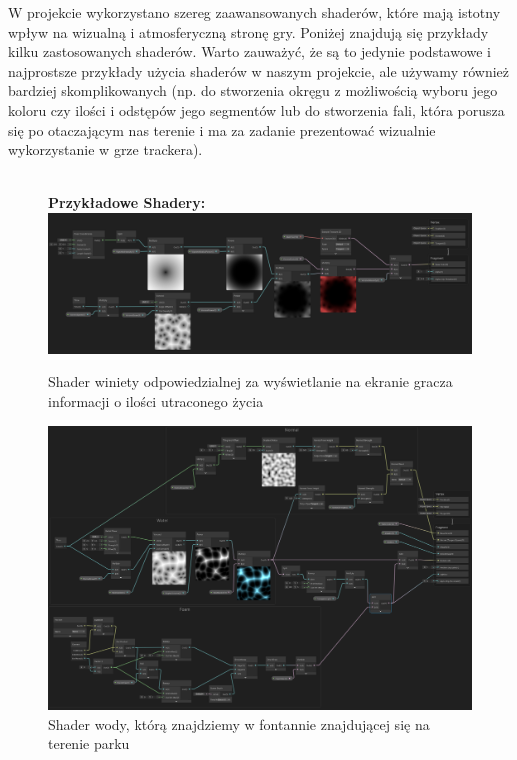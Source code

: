 W projekcie wykorzystano szereg zaawansowanych shaderów, które mają istotny wpływ na wizualną i atmosferyczną stronę gry. Poniżej znajdują się przykłady kilku zastosowanych shaderów. Warto zauważyć, że są to jedynie podstawowe i najprostsze przykłady użycia shaderów w naszym projekcie, ale używamy również bardziej skomplikowanych (np. do stworzenia okręgu z możliwością wyboru jego koloru czy ilości i odstępów jego segmentów lub do stworzenia fali, która porusza się po otaczającym nas terenie i ma za zadanie prezentować wizualnie wykorzystanie w grze trackera). \\ \\
\begin{figure}[h]
\textbf{Przykładowe Shadery:}
    \centering
    \includegraphics[width=1\linewidth]{Images/vignetteShader.png}
    \caption{Shader winiety odpowiedzialnej za wyświetlanie na ekranie gracza informacji o ilości utraconego życia}
\end{figure}
\begin{figure}[h]
    \centering
    \includegraphics[width=1\linewidth]{Images/waterShader.png}
    \caption{Shader wody, którą znajdziemy w fontannie znajdującej się na terenie parku}   
\end{figure}

